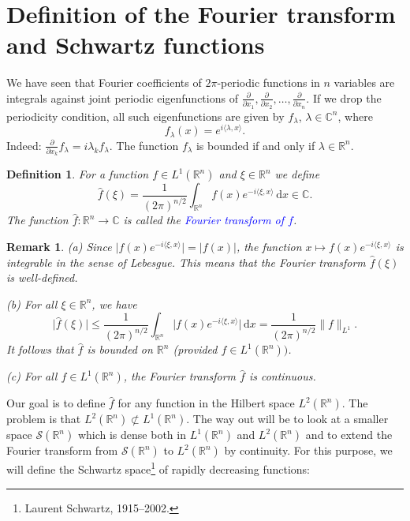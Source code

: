 \documentclass[12pt, oneside, a4paper]{article}
\theoremstyle{dfn}
\newtheorem{dfn}[thm]{Definition}
\newtheorem{rem}[thm]{Remark}
\newcommand{\scalprod}[2]{\langle #1,#2 \rangle}
\def \S {\ensuremath{\mathcal{S}}}
\def \S {\ensuremath{\mathcal{S}}}
\def\Rbb{\ensuremath{\mathbb{R}}}
\def\dx{\,\mathrm dx}
\providecommand{\norm}[1]{\lVert#1\rVert}
\newcommand{\Com}{\mathbb{C}}
\providecommand{\abs}[1]{\lvert#1\rvert}
\begin{document}
\section{Definition of the Fourier transform and Schwartz functions}

We have seen that Fourier coefficients of $2\pi$-periodic functions in $n$ variables are integrals against joint periodic eigenfunctions of $\frac{\partial}{\partial x_1}, \frac{\partial}{\partial x_2}, \ldots, \frac{\partial}{\partial x_n}$. If we drop the periodicity condition, all such eigenfunctions are given by $f_\lambda$, $\lambda \in \Com^n$, where \[
f_\lambda(x) = e^{i \scalprod{\lambda}{x}}.
\]
Indeed: $\frac{\partial}{\partial x_k} f_\lambda = i\lambda_k f_\lambda$. The function $f_\lambda$ is bounded if and only if $\lambda \in \Rbb^n$.

\begin{dfn}\label{def:FourierTransform}
For a function $f \in L^1(\Rbb^n)$ and $\xi \in  \Rbb^n$ we define
\[
\widehat{f} (\xi) = \frac{1}{(2\pi)^{n/2}} \int_{\Rbb^n} f(x) e^{-i \scalprod{\xi}{x}} \dx \in \Com.
\]
The function $\widehat{f} \colon \Rbb^n \to \Com$ is called the \textcolor{blue}{Fourier transform of $f$}.
\end{dfn}

\begin{rem}
(a) Since $\abs{f(x) e^{-i\scalprod{\xi}{x}}} = \abs{f(x)}$, the function $x \mapsto f(x) e^{-i\scalprod{\xi}{x}}$ is integrable in the sense of Lebesgue.
This means that the Fourier transform $\widehat{f}(\xi)$ is well-defined.

(b) For all $\xi \in \Rbb^n$, we have
	\[
	\abs{\widehat{f}(\xi)} \leqslant \frac{1}{(2\pi)^{n/2}} \int_{\Rbb^n} \abs{f(x) e^{-i\scalprod{\xi}{x}}} \dx = \frac{1}{(2\pi)^{n/2}} \norm{f}_{L^1}.
	\]
	It follows that $\widehat{f}$ is bounded on $\Rbb^n$ (provided $f \in L^1(\Rbb^n))$.

(c) For all $f \in L^1(\Rbb^n)$, the Fourier transform $\widehat{f}$ is continuous.
\end{rem}

Our goal is to define $\widehat{f}$ for any function in the Hilbert space $L^2(\Rbb^n)$. The problem is that $L^2(\Rbb^n) \not\subset L^1(\Rbb^n)$. The way out will be to look at a smaller space $\S(\Rbb^n)$ which is dense both in $L^1(\Rbb^n)$ and $L^2(\Rbb^n)$ and to extend the Fourier transform from $\S(\Rbb^n)$ to $L^2(\Rbb^n)$ by continuity. For this purpose, we will define the Schwartz space\footnote{Laurent Schwartz, 1915--2002.} of rapidly decreasing functions:
\end{document}

